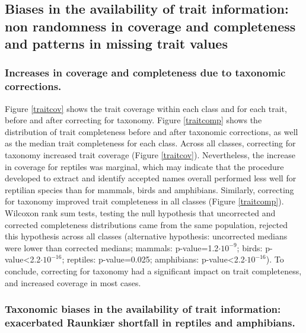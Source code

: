 \subsection{Biases in the availability of trait information: non randomness in coverage and completeness and patterns in missing trait values}

\subsubsection{Increases in coverage and completeness due to taxonomic corrections.} 
Figure \ref{traitcov} shows the trait coverage within each class and for each trait, before and after correcting for taxonomy. Figure \ref{traitcomp} shows the distribution of trait completeness before and after taxonomic corrections, as well as the median trait completeness for each class.
Across all classes, correcting for taxonomy increased trait coverage (Figure \ref{traitcov}). Nevertheless, the increase in coverage for reptiles was marginal, which may indicate that the procedure developed to extract and identify accepted names overall performed less well for reptilian species than for mammals, birds and amphibians. Similarly, correcting for taxonomy improved trait completeness in all classes (Figure \ref{traitcomp}). Wilcoxon rank sum tests, testing the null hypothesis that uncorrected and corrected completeness distributions came from the same population, rejected this hypothesis across all classes (alternative hypothesis: uncorrected medians were lower than corrected medians; mammals: p-value=1.2$\cdot10^{-9}$; birds: p-value<2.2$\cdot10^{-16}$; reptiles: p-value=0.025; amphibians: p-value<2.2$\cdot10^{-16}$). To conclude, correcting for taxonomy had a significant impact on trait completeness, and increased coverage in most cases. 

\subsubsection{Taxonomic biases in the availability of trait information: exacerbated Raunki{\ae}r shortfall in reptiles and amphibians.}

